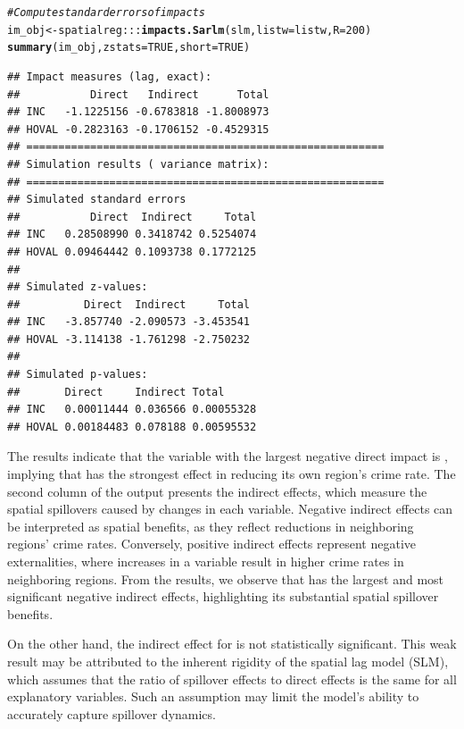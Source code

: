 \documentclass[english,12pt]{book}\usepackage[]{graphicx}\usepackage[]{xcolor}
\makeatletter
\newcommand{\hlnum}[1]{\textcolor[rgb]{0.686,0.059,0.569}{#1}}%
\newcommand{\hlcom}[1]{\textcolor[rgb]{0.678,0.584,0.686}{\textit{#1}}}%
\newcommand{\hlopt}[1]{\textcolor[rgb]{0,0,0}{#1}}%
\newcommand{\hlstd}[1]{\textcolor[rgb]{0.345,0.345,0.345}{#1}}%
\newcommand{\hlkwb}[1]{\textcolor[rgb]{0.69,0.353,0.396}{#1}}%
\newcommand{\hlkwc}[1]{\textcolor[rgb]{0.333,0.667,0.333}{#1}}%
\newcommand{\hlkwd}[1]{\textcolor[rgb]{0.737,0.353,0.396}{\textbf{#1}}}%
\newenvironment{kframe}{%
 \def\at@end@of@kframe{}%
 \ifinner\ifhmode%
  \def\at@end@of@kframe{\end{minipage}}%
  \begin{minipage}{\columnwidth}%
 \fi\fi%
 \def\FrameCommand##1{\hskip\@totalleftmargin \hskip-\fboxsep
 \colorbox{shadecolor}{##1}\hskip-\fboxsep
     \hskip-\linewidth \hskip-\@totalleftmargin \hskip\columnwidth}%
 \MakeFramed {\advance\hsize-\width
   \@totalleftmargin\z@ \linewidth\hsize
   \@setminipage}}%
 {\par\unskip\endMakeFramed%
 \at@end@of@kframe}
\newenvironment{knitrout}{}{} %
\makeatother
\begin{document}
\begin{knitrout}
\color{fgcolor}\begin{kframe}
\begin{alltt}
\hlcom{# Compute standard errors of impacts}
\hlstd{im_obj} \hlkwb{<-} \hlstd{spatialreg}\hlopt{:::}\hlkwd{impacts.Sarlm}\hlstd{(slm,} \hlkwc{listw} \hlstd{= listw,} \hlkwc{R} \hlstd{=} \hlnum{200}\hlstd{)}
\hlkwd{summary}\hlstd{(im_obj,} \hlkwc{zstats} \hlstd{=} \hlnum{TRUE}\hlstd{,} \hlkwc{short} \hlstd{=} \hlnum{TRUE}\hlstd{)}
\end{alltt}
\begin{verbatim}
## Impact measures (lag, exact):
##           Direct   Indirect      Total
## INC   -1.1225156 -0.6783818 -1.8008973
## HOVAL -0.2823163 -0.1706152 -0.4529315
## ========================================================
## Simulation results ( variance matrix):
## ========================================================
## Simulated standard errors
##           Direct  Indirect     Total
## INC   0.28508990 0.3418742 0.5254074
## HOVAL 0.09464442 0.1093738 0.1772125
## 
## Simulated z-values:
##          Direct  Indirect     Total
## INC   -3.857740 -2.090573 -3.453541
## HOVAL -3.114138 -1.761298 -2.750232
## 
## Simulated p-values:
##       Direct     Indirect Total     
## INC   0.00011444 0.036566 0.00055328
## HOVAL 0.00184483 0.078188 0.00595532
\end{verbatim}
\end{kframe}
\end{knitrout}

The results indicate that the variable with the largest negative direct impact is , implying that  has the strongest effect in reducing its own region’s crime rate. The second column of the output presents the indirect effects, which measure the spatial spillovers caused by changes in each variable. Negative indirect effects can be interpreted as spatial benefits, as they reflect reductions in neighboring regions’ crime rates. Conversely, positive indirect effects represent negative externalities, where increases in a variable result in higher crime rates in neighboring regions. From the results, we observe that  has the largest and most significant negative indirect effects, highlighting its substantial spatial spillover benefits. 

On the other hand, the indirect effect for  is not statistically significant. This weak result may be attributed to the inherent rigidity of the spatial lag model (SLM), which assumes that the ratio of spillover effects to direct effects is the same for all explanatory variables. Such an assumption may limit the model’s ability to accurately capture spillover dynamics.
\end{document}
